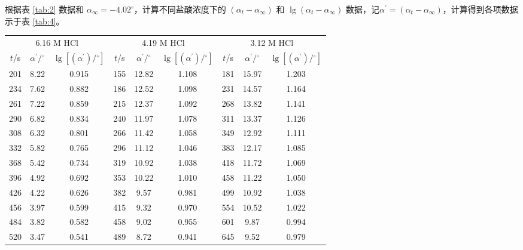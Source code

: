 根据表 \ref{tab:2} 数据和 $\alpha_{\infty}=-4.02^{\circ}$，计算不同盐酸浓度下的 $\left(\alpha_t-\alpha_{\infty}\right)$ 和 $\lg \left(\alpha_t-\alpha_{\infty}\right)$ 数据，记$\alpha^\prime = \left(\alpha_t-\alpha_{\infty}\right)$，计算得到各项数据示于表 \ref{tab:4}。

\begin{table}[H]
    \centering
    \begin{tabular}{ccc|ccc|ccc}
        \toprule
        \multicolumn{3}{c|}{6.16 M HCl} & \multicolumn{3}{c|}{4.19 M HCl} & \multicolumn{3}{c}{3.12 M HCl} \\
       $t$/s & $\alpha^\prime/\mathrm{{}^\circ}$ & $\lg \left[(\alpha^\prime)/\mathrm{{}^\circ}\right]$ & $t$/s & $\alpha^\prime/\mathrm{{}^\circ}$ & $\lg \left[(\alpha^\prime)/\mathrm{{}^\circ}\right]$ & $t$/s & $\alpha^\prime/\mathrm{{}^\circ}$ & $\lg \left[(\alpha^\prime)/\mathrm{{}^\circ}\right]$ \\
        \midrule
        201 & 8.22 & 0.915 & 155 & 12.82 & 1.108 & 181 & 15.97 & 1.203 \\
        234 & 7.62 & 0.882 & 186 & 12.52 & 1.098 & 231 & 14.57 & 1.164 \\
        261 & 7.22 & 0.859 & 215 & 12.37 & 1.092 & 268 & 13.82 & 1.141 \\
        290 & 6.82 & 0.834 & 240 & 11.97 & 1.078 & 311 & 13.37 & 1.126 \\
        308 & 6.32 & 0.801 & 266 & 11.42 & 1.058 & 349 & 12.92 & 1.111 \\
        332 & 5.82 & 0.765 & 296 & 11.12 & 1.046 & 383 & 12.17 & 1.085 \\
        368 & 5.42 & 0.734 & 319 & 10.92 & 1.038 & 418 & 11.72 & 1.069 \\
        396 & 4.92 & 0.692 & 353 & 10.22 & 1.010 & 458 & 11.22 & 1.050 \\
        426 & 4.22 & 0.626 & 382 & 9.57 & 0.981 & 499 & 10.92 & 1.038 \\
        456 & 3.97 & 0.599 & 415 & 9.32 & 0.970 & 554 & 10.52 & 1.022 \\
        484 & 3.82 & 0.582 & 458 & 9.02 & 0.955 & 601 & 9.87 & 0.994 \\
        520 & 3.47 & 0.541 & 489 & 8.72 & 0.941 & 645 & 9.52 & 0.979 \\

\end{tabular}
\end{table}
